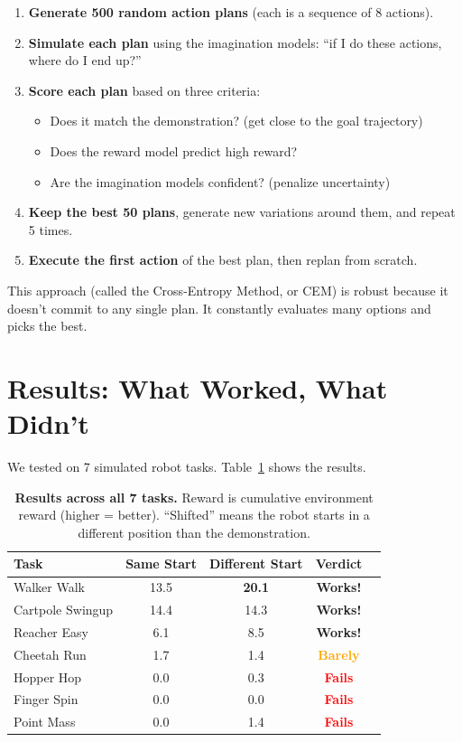 \documentclass{article}
\begin{document}
\begin{enumerate}[nosep]
    \item \textbf{Generate 500 random action plans} (each is a sequence of 8 actions).
    \item \textbf{Simulate each plan} using the imagination models: ``if I do these actions, where do I end up?''
    \item \textbf{Score each plan} based on three criteria:
    \begin{itemize}[nosep]
        \item Does it match the demonstration? (get close to the goal trajectory)
        \item Does the reward model predict high reward?
        \item Are the imagination models confident? (penalize uncertainty)
    \end{itemize}
    \item \textbf{Keep the best 50 plans}, generate new variations around them, and repeat 5 times.
    \item \textbf{Execute the first action} of the best plan, then replan from scratch.
\end{enumerate}

This approach (called the Cross-Entropy Method, or CEM) is robust because it doesn't commit to any single plan. It constantly evaluates many options and picks the best.

\section{Results: What Worked, What Didn't}

We tested on 7 simulated robot tasks. Table~\ref{tab:results} shows the results.

\begin{table}[h]
\centering
\caption{\textbf{Results across all 7 tasks.} Reward is cumulative environment reward (higher = better). ``Shifted'' means the robot starts in a different position than the demonstration.}
\label{tab:results}
\begin{tabular}{lcccl}
\toprule
\textbf{Task} & \textbf{Same Start} & \textbf{Different Start} & \textbf{Verdict} \\
\midrule
Walker Walk & 13.5 & \textbf{20.1} & \textcolor{green!60!black}{\textbf{Works!}} \\
Cartpole Swingup & 14.4 & 14.3 & \textcolor{green!60!black}{\textbf{Works!}} \\
Reacher Easy & 6.1 & 8.5 & \textcolor{green!60!black}{\textbf{Works!}} \\
Cheetah Run & 1.7 & 1.4 & \textcolor{orange}{\textbf{Barely}} \\
Hopper Hop & 0.0 & 0.3 & \textcolor{red}{\textbf{Fails}} \\
Finger Spin & 0.0 & 0.0 & \textcolor{red}{\textbf{Fails}} \\
Point Mass & 0.0 & 1.4 & \textcolor{red}{\textbf{Fails}} \\
\bottomrule
\end{tabular}
\end{table}
\end{document}
